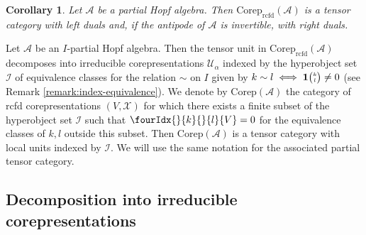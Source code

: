 \documentclass[10pt]{article}
\DeclareMathOperator{\rcf}{\mathrm{rcfd}}
\newcommand{\Corep}{\mathrm{Corep}}
\newcommand{\Grt}[3]{#1{\tiny {\begin{pmatrix} #2\\#3\end{pmatrix}}}}
\newcommand{\UnitC}[2]{\Grt{\mathbf{1}}{#1}{#2}}
\newcommand{\Gr}[5]{\fourIdx{#2}{#4}{#3}{#5}{#1}}%
\newcommand{\Gru}[3]{\Gr{#1}{}{}{#2}{#3}}
\newtheorem{Cor}[Theorem]{Corollary}
\theoremstyle{definition}
\numberwithin{equation}{section}
\begin{document}
\begin{Cor} \label{cor:rep-tensor-duality}
  Let $\mathscr{A}$ be a partial Hopf algebra. Then
  $\Corep_{\rcf}(\mathscr{A})$ is a tensor category with left
  duals and, if the antipode of $\mathscr{A}$ is invertible, with right duals.
\end{Cor}

Let $\mathscr{A}$ be an $I$-partial Hopf algebra.  Then the tensor
unit in $\Corep_{\rcf}(\mathscr{A})$ decomposes
into irreducible corepresentations  $\mathscr{U}_{\alpha}$ indexed by the hyperobject set $\mathscr{I}$ of equivalence
classes for the relation $\sim$ on $I$ given by  $k \sim l \iff
  \UnitC{k}{l}\neq 0$ (see Remark
\ref{remark:index-equivalence}). We denote by $\Corep(\mathscr{A})$ the category of rcfd corepresentations $(V,\mathscr{X})$ for which there exists a finite subset of the hyperobject set $\mathscr{I}$ such that $\Gru{V}{k}{l}=0$ for the equivalence classes of $k,l$ outside this subset. Then $\Corep(\mathscr{A})$ is a tensor category with local units indexed by $\mathscr{I}$. We will use the same notation for the associated partial tensor category. 


\subsection{Decomposition into irreducible corepresentations}
\end{document}
